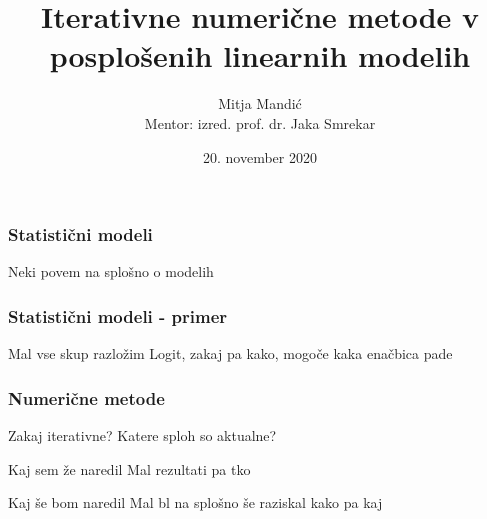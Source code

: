 \documentclass[14pt]{beamer}
\begin{document}
    \title[Diplomski seminar]{Iterativne numerične metode v posplošenih linearnih modelih}
    \author[Mitek]{Mitja Mandić \\ \small Mentor: izred. prof. dr. Jaka Smrekar}
    \date{20. november 2020} 
\begin{frame}
    \titlepage
\end{frame}

\begin{frame} \frametitle{Statistični modeli}
    Neki povem na splošno o modelih
\end{frame}

\begin{frame} \frametitle{Statistični modeli - primer}
    Mal vse skup razložim Logit, zakaj pa kako, mogoče kaka enačbica pade
\end{frame}

\begin{frame}\frametitle{Numerične metode}
    Zakaj iterativne? Katere sploh so aktualne?
\end{frame}

\begin{frame}{Kaj sem že naredil}
    Mal rezultati pa tko
\end{frame}

\begin{frame}{Kaj še bom naredil}
    Mal bl na splošno še raziskal kako pa kaj
\end{frame}
\end{document}
